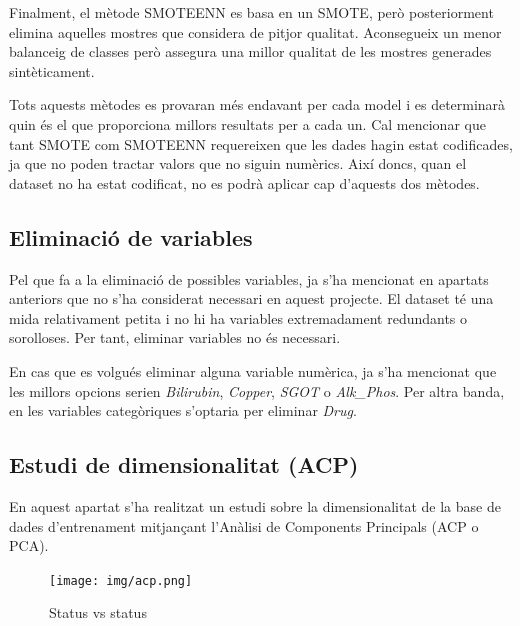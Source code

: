 Finalment, el mètode SMOTEENN es basa en un SMOTE, però posteriorment elimina aquelles mostres que considera de pitjor qualitat. Aconsegueix un menor balanceig de classes però assegura una millor qualitat de les mostres generades sintèticament.

Tots aquests mètodes es provaran més endavant per cada model i es determinarà quin és el que proporciona millors resultats per a cada un. Cal mencionar que tant SMOTE com SMOTEENN requereixen que les dades hagin estat codificades, ja que no poden tractar valors que no siguin numèrics. Així doncs, quan el dataset no ha estat codificat, no es podrà aplicar cap d'aquests dos mètodes.

\subsection{Eliminació de variables}
Pel que fa a la eliminació de possibles variables, ja s'ha mencionat en apartats anteriors que no s'ha considerat necessari en aquest projecte. El dataset té una mida relativament petita i no hi ha variables extremadament redundants o sorolloses. Per tant, eliminar variables no és necessari.

En cas que es volgués eliminar alguna variable numèrica, ja s'ha mencionat que les millors opcions serien \textit{Bilirubin}, \textit{Copper}, \textit{SGOT} o \textit{Alk\_Phos}. Per altra banda, en les variables categòriques s'optaria per eliminar \textit{Drug}.

\subsection{Estudi de dimensionalitat (ACP)}
En aquest apartat s'ha realitzat un estudi sobre la dimensionalitat de la base de dades d'entrenament mitjançant l'Anàlisi de Components Principals (ACP o PCA).

\begin{figure}[H]
    \texttt{[image: img/acp.png]}
    \caption{Status vs status}
    \label{fig:status_vs_status}
\end{figure}

